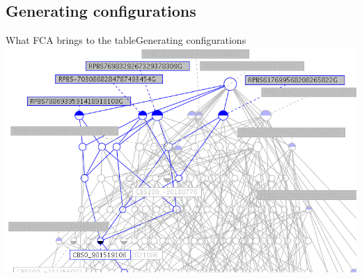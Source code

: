 %
\subsection{Generating configurations}

\begin{frame}{What FCA brings to the table}{Generating configurations}
  \centering
  \includegraphics[width=\textwidth]{img/fca/lattice_generating}
\end{frame}

